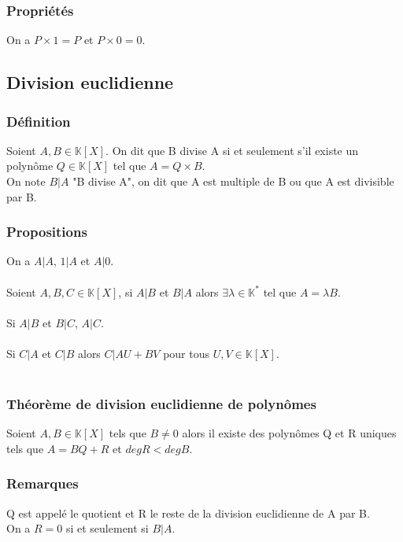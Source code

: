 \documentclass[a4paper,10pt]{book} %
\newcommand{\K}{\mathbb{K}}
\begin{document}
\subsubsection{Propriétés}
On a $P\times 1=P$ et $P\times 0=0$.\\

\newpage

\subsection{Division euclidienne}
\subsubsection{Définition}
Soient $A,B \in \K[X]$. On dit que B divise A si et seulement s'il existe un polynôme $Q\in \K[X]$ tel que $A=Q\times B$.\\

On note $B|A$ "B divise A", on dit que A est multiple de B ou que A est divisible par B.

\subsubsection{Propositions}
On a $A|A$, $1|A$ et $A|0$.\\\\
Soient $A,B,C \in \K[X]$, si $A|B$ et $B|A$ alors $\exists \lambda\in\K^{*}$ tel que $A=\lambda B$.\\\\
Si $A|B$ et $B|C$, $A|C$.\\\\
Si $C|A$ et $C|B$ alors $C|AU+BV$ pour tous $U,V \in \K[X]$.\\\\

\subsubsection{Théorème de division euclidienne de polynômes}
Soient $A,B \in \K[X]$ tels que $B\neq 0$ alors il existe des polynômes Q et R uniques tels que $A=BQ+R$ et $deg R<deg B$.

\subsubsection{Remarques}
Q est appelé le quotient et R le reste de la division euclidienne de A par B.\\
On a $R=0$ si et seulement si $B|A$.
\end{document}
